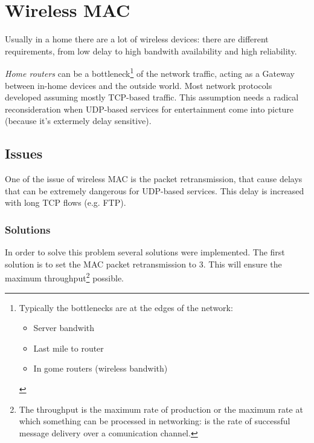 \chapter{Wireless MAC}


Usually in a home there are a lot of wireless devices: there are different
requirements, from low delay to high bandwith availability and high reliability.

\textit{Home routers} can be a bottleneck\footnote{
  Typically the bottlenecks are at the edges of the network:
  \begin{itemize}
  \item Server bandwith
  \item Last mile to router
  \item In gome routers (wireless bandwith)
  \end{itemize}
}
of the network traffic, acting as a Gateway between in-home devices and the
outside world.
Most network protocols developed assuming mostly TCP-based traffic. This
assumption needs a radical reconsideration when UDP-based services for
entertainment come into picture (because it's extermely delay sensitive).

\section{Issues}

One of the issue of wireless MAC is the packet retransmission, that cause delays
that can be extremely dangerous for UDP-based services. This delay is increased
with long TCP flows (e.g. FTP).

\subsection{Solutions}

In order to solve this problem several solutions were implemented. The first
solution is to set the MAC packet retransmission to 3. This will ensure the
maximum throughput\footnote{
  The throughput is the maximum rate of production or the maximum rate at which
  something can be processed in networking: is the rate of successful message
  delivery over a comunication channel.
}
possible.

